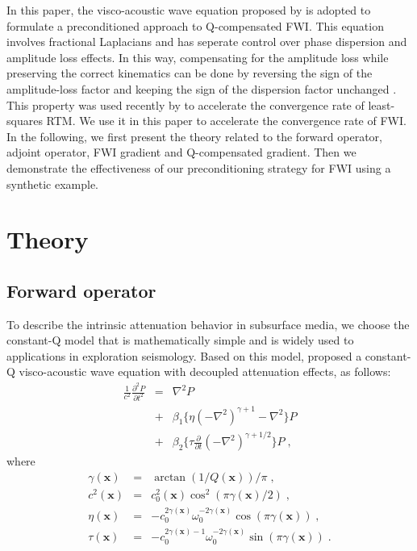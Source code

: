 In this paper, the visco-acoustic wave equation proposed by \cite{zhu14} is adopted to formulate a preconditioned approach to Q-compensated FWI.
This equation involves fractional Laplacians and has seperate control over phase dispersion and amplitude loss effects.
In this way, compensating for the amplitude loss while preserving the correct kinematics can be done by reversing the sign of the amplitude-loss factor and keeping the sign of the dispersion factor unchanged \cite[]{zhu16}.
This property was used recently by \cite{sun16b} to accelerate the convergence rate of least-squares RTM.
We use it in this paper to accelerate the convergence rate of FWI.
In the following, we first present the theory related to the forward operator, adjoint operator, FWI gradient and Q-compensated gradient.
Then we demonstrate the effectiveness of our preconditioning strategy for FWI using a synthetic example.

\section{Theory}

\subsection{Forward operator}

To describe the intrinsic attenuation behavior in subsurface media, we choose the constant-Q model \cite[]{kjartansson79} that is mathematically simple and is widely used to applications in exploration seismology.
Based on this model, \cite{zhu14} proposed a constant-Q visco-acoustic wave equation with decoupled attenuation effects, as follows:
\begin{eqnarray}
	\label{eq:forward}
	\frac{1}{c^2} \frac{\partial^2 P}{\partial t^2} & = & \nabla^2 P \nonumber \\
													& + & \beta_1 \{\eta(-\nabla^2)^{\gamma+1}-\nabla^2 \}P \nonumber \\
													& + & \beta_2 \{\tau \frac{\partial}{\partial t} (-\nabla^2)^{\gamma+1/2} \}P \; ,
\end{eqnarray}
where
\begin{eqnarray}
	\label{eq:parameter}
	\label{eq:gamma}
	\gamma(\mathbf{x}) & = & \arctan(1/Q(\mathbf{x}))/\pi \; , \\
	c^2(\mathbf{x}) & = & c_0^2 (\mathbf{x}) \cos^2(\pi \gamma(\mathbf{x})/2) \; , \\
	\eta(\mathbf{x}) &  = & -c_0^{2\gamma(\mathbf{x})} \omega_0^{-2\gamma(\mathbf{x})}\cos(\pi \gamma(\mathbf{x})) \; , \\
	\tau(\mathbf{x}) &  = & -c_0^{2\gamma(\mathbf{x})-1} \omega_0^{-2\gamma(\mathbf{x})}\sin(\pi \gamma(\mathbf{x})) \; .
\end{eqnarray}

